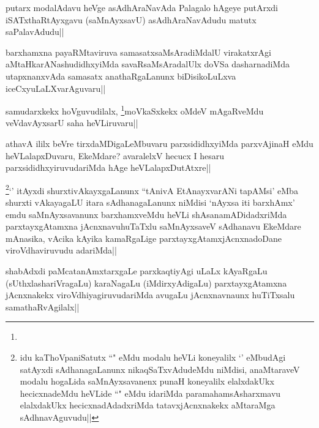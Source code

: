 \begin{artha}
putarx modalAdavu heVge asAdhAraNavAda Palagalo hAgeye putArxdi iSATxthaRtAyxgavu (saMnAyxsavU) asAdhAraNavAdudu matutx saPalavAdudu||
\end{artha}

\begin{artha}
barxhamxna payaRMtaviruva samasatxsaMsAradiMdalU virakatxrAgi aMtaHkarANashudidhxyiMda savaRsaMsAradalUlx doVSa dasharnadiMda utapxnanxvAda samasatx anathaRgaLanunx biDisikoLuLxva iceCxyuLaLXvarAguvaru||
\end{artha}


\begin{artha}
samudarxkekx hoVguvudilalx, \footnote{}moVkaSxkekx oMdeV mAgaRveMdu veVdavAyxsarU saha heVLiruvaru|| 
\end{artha}


\begin{artha}
athavA ililx beVre tirxdaMDigaLeMbuvaru parxsididhxyiMda parxvAjinaH eMdu heVLalapxDuvaru, EkeMdare? avaralelxV hecucx I hesaru parxsididhxyiruvudariMda hAge heVLalapxDutAtxre||
\end{artha}


\begin{artha}
\footnote{\stext \stext idu kaThoVpaniSatutx ``\stext" eMdu modalu heVLi koneyalilx `\stext' eMbudAgi satAyxdi sAdhanagaLanunx nikaqSaTxvAdudeMdu niMdisi, anaMtaraveV modalu hogaLida saMnAyxsavanenx punaH koneyalilx elalxdakUkx hecicxnadeMdu heVLide ``\stext" eMdu idariMda paramahamsAsharxmavu elalxdakUkx hecicxnadAdadxriMda tatavxjAcnxnakekx aMtaraMga sAdhnavAguvudu||}`\stext' itAyxdi shurxtivAkayxgaLanunx ``tAnivA EtAnayxvarANi tapAMsi' eMba shurxti vAkayagaLU itara sAdhanagaLanunx niMdisi `nAyxsa iti barxhAmx' emdu saMnAyxsavanunx barxhamxveMdu heVLi shAsanamADidadxriMda parxtayxgAtamxna jAcnxnavuhuTaTxlu saMnAyxsaveV sAdhanavu EkeMdare mAnasika, vAcika kAyika kamaRgaLige parxtayxgAtamxjAcnxnadoDane viroVdhaviruvudu adariMda||
\end{artha}


\begin{artha}
shabAdxdi paMcatanAmxtarxgaLe parxkaqtiyAgi uLaLx kAyaRgaLu (sUthxlashariVragaLu) karaNagaLu (iMdirxyAdigaLu) parxtayxgAtamxna jAcnxnakekx viroVdhiyagiruvudariMda avugaLu jAcnxnavnaunx huTiTxsalu samathaRvAgilalx||
\end{artha}

